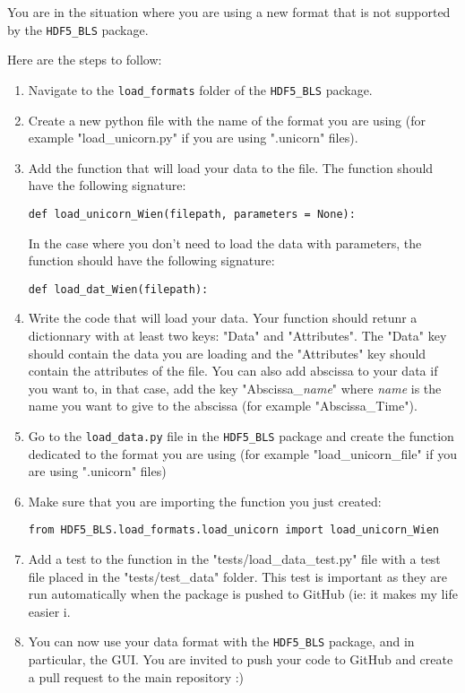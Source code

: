 \begin{tcolorbox}
    You are in the situation where you are using a new format that is not supported by the \texttt{HDF5\_BLS} package.
\end{tcolorbox}

Here are the steps to follow:
\begin{enumerate}
    \item Navigate to the \texttt{load\_formats} folder of the \texttt{HDF5\_BLS} package. 
    \item Create a new python file with the name of the format you are using (for example "load\_unicorn.py" if you are using ".unicorn" files).
    \item Add the function that will load your data to the file. The function should have the following signature:
\begin{lstlisting}
def load_unicorn_Wien(filepath, parameters = None):
\end{lstlisting}
    In the case where you don't need to load the data with parameters, the function should have the following signature:
\begin{lstlisting}
def load_dat_Wien(filepath):
\end{lstlisting}
    \item Write the code that will load your data. Your function should retunr a dictionnary with at least two keys: "Data" and "Attributes". The "Data" key should contain the data you are loading and the "Attributes" key should contain the attributes of the file. You can also add abscissa to your data if you want to, in that case, add the key "Abscissa\_\textsl{name}" where \textsl{name} is the name you want to give to the abscissa (for example "Abscissa\_Time").
    \item Go to the \texttt{load\_data.py} file in the \texttt{HDF5\_BLS} package and create the function dedicated to the format you are using (for example "load\_unicorn\_file" if you are using ".unicorn" files)
    \item Make sure that you are importing the function you just created:
\begin{lstlisting}
from HDF5_BLS.load_formats.load_unicorn import load_unicorn_Wien
\end{lstlisting}
    \item Add a test to the function in the "tests/load\_data\_test.py" file with a test file placed in the "tests/test\_data" folder. This test is important as they are run automatically when the package is pushed to GitHub (ie: it makes my life easier ^^). 
    \item You can now use your data format with the \texttt{HDF5\_BLS} package, and in particular, the GUI. You are invited to push your code to GitHub and create a pull request to the main repository :)
\end{enumerate}

